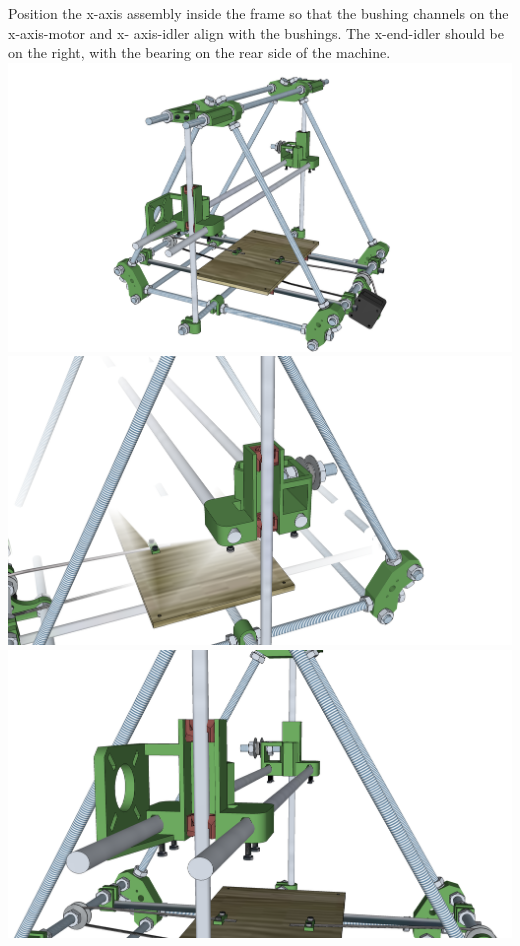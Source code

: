 \documentclass[twoside,a4paper,titlepage]{memoir}
\begin{document}
	\section{}
	Position the x-axis assembly inside the frame so that the bushing channels on the x-axis-motor and x-
	axis-idler align with the bushings. The x-end-idler should be on the right, with the bearing on the rear
	side of the machine.\\
	\includegraphics[width=1\linewidth]{graphics/ch8_10_1.png}
	\includegraphics[width=1\linewidth]{graphics/ch8_10_2.png}
	\includegraphics[width=1\linewidth]{graphics/ch8_10_3.png}
	
\end{document}

